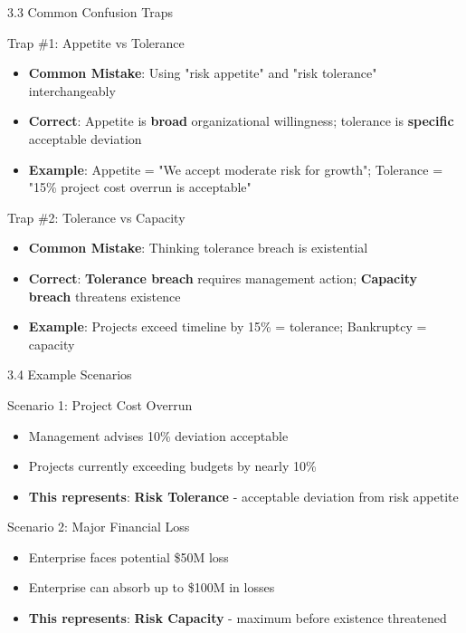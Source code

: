 \documentclass{beamer}
\begin{document}
	\begin{frame}{3.3 Common Confusion Traps}
		\begin{block}{Trap \#1: Appetite vs Tolerance}
			\begin{itemize}
				\item \textbf{Common Mistake}: Using "risk appetite" and "risk tolerance" interchangeably
				\item \textbf{Correct}: Appetite is \textbf{broad} organizational willingness; tolerance is \textbf{specific} acceptable deviation
				\item \textbf{Example}: Appetite = "We accept moderate risk for growth"; Tolerance = "15\% project cost overrun is acceptable"
			\end{itemize}
		\end{block}
		
		\begin{block}{Trap \#2: Tolerance vs Capacity}
			\begin{itemize}
				\item \textbf{Common Mistake}: Thinking tolerance breach is existential
				\item \textbf{Correct}: \textbf{Tolerance breach} requires management action; \textbf{Capacity breach} threatens existence
				\item \textbf{Example}: Projects exceed timeline by 15\% = tolerance; Bankruptcy = capacity
			\end{itemize}
		\end{block}
	\end{frame}
	
	\begin{frame}{3.4 Example Scenarios}
		\begin{block}{Scenario 1: Project Cost Overrun}
			\begin{itemize}
				\item Management advises 10\% deviation acceptable
				\item Projects currently exceeding budgets by nearly 10\%
				\item \textbf{This represents}: \textbf{Risk Tolerance} - acceptable deviation from risk appetite
			\end{itemize}
		\end{block}
		
		\begin{block}{Scenario 2: Major Financial Loss}
			\begin{itemize}
				\item Enterprise faces potential \$50M loss
				\item Enterprise can absorb up to \$100M in losses
				\item \textbf{This represents}: \textbf{Risk Capacity} - maximum before existence threatened
			\end{itemize}
		\end{block}
	\end{frame}
	
\end{document}
